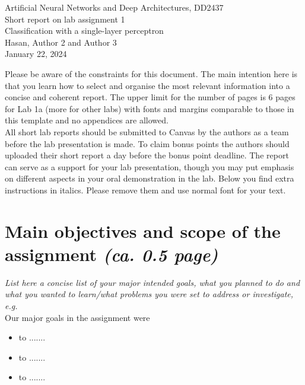 \documentclass[a4paper]{article}
\begin{document}
\begin{center}
  {\large Artificial Neural Networks and Deep Architectures, DD2437}\\
  \vspace{7mm}
  {\huge Short report on lab assignment 1\\[1ex]}
  {\Large Classification with a single-layer perceptron}\\
  \vspace{8mm}  
  {\Large Hasan, Author 2 and Author 3\\}
  \vspace{4mm}
  {\large January 22, 2024 \\}
\end{center}

\begin{framed}
Please be aware of the constraints for this document. The main intention here is that you learn how to select and organise the most relevant information into a concise and coherent report. The upper limit for the number of pages is 6 pages for Lab 1a (more for other labs) with fonts and margins comparable to those in this template and no appendices are allowed. \\
All short lab reports should be submitted to Canvas by the authors as a team before the lab presentation is made. To claim bonus points the authors should uploaded their short report a day before the bonus point deadline. The report can serve as a support for your lab presentation, though you may put emphasis on different aspects in your oral demonstration in the lab.
Below you find extra instructions in italics. Please remove them and use normal font for your text.
\end{framed}

\section{Main objectives and scope of the assignment \normalsize{\textit{(ca. 0.5 page)}}}

\textit{List here a concise list of your major intended goals, what you planned to do and what you wanted to learn/what problems you were set to address or investigate, e.g.}\\
Our major goals in the assignment were  
\begin{itemize}
\item to .......
\item to .......
\item to ....... 
\end{itemize}
\end{document}
